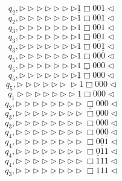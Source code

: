 \documentclass[12pt,a4paper]{article}
\theoremstyle{definition}
\begin{document}
\begin{enumerate}
\begin{enumerate}
			$$q_2,\triangleright\triangleright\triangleright\triangleright\triangleright\triangleright\triangleright\underline{1}\Box001\triangleleft$$
			$$q_2,\triangleright\triangleright\triangleright\triangleright\triangleright\triangleright\triangleright1\underline{\Box}001\triangleleft$$
			$$q_3,\triangleright\triangleright\triangleright\triangleright\triangleright\triangleright\triangleright1\Box\underline{0}01\triangleleft$$
			$$q_3,\triangleright\triangleright\triangleright\triangleright\triangleright\triangleright\triangleright1\Box0\underline{0}1\triangleleft$$
			$$q_3,\triangleright\triangleright\triangleright\triangleright\triangleright\triangleright\triangleright1\Box00\underline{1}\triangleleft$$
			$$q_5,\triangleright\triangleright\triangleright\triangleright\triangleright\triangleright\triangleright1\Box0\underline{0}0\triangleleft$$
			$$q_5,\triangleright\triangleright\triangleright\triangleright\triangleright\triangleright\triangleright1\underline{\Box}000\triangleleft$$
			$$q_5,\triangleright\triangleright\triangleright\triangleright\triangleright\triangleright\triangleright\underline{1}\Box000\triangleleft$$
			$$q_5,\triangleright\triangleright\triangleright\triangleright\triangleright\triangleright\underline{\triangleright}1\Box000\triangleleft$$
			$$q_1\triangleright\triangleright\triangleright\triangleright\triangleright\triangleright\triangleright\underline{1}\Box000\triangleleft$$
			$$q_2,\triangleright\triangleright\triangleright\triangleright\triangleright\triangleright\triangleright\triangleright\underline{\Box}000\triangleleft$$
			$$q_3,\triangleright\triangleright\triangleright\triangleright\triangleright\triangleright\triangleright\triangleright\Box\underline{0}00\triangleleft$$
			$$q_3,\triangleright\triangleright\triangleright\triangleright\triangleright\triangleright\triangleright\triangleright\Box000\underline{\triangleleft}$$
			$$q_4,\triangleright\triangleright\triangleright\triangleright\triangleright\triangleright\triangleright\triangleright\Box00\underline{0}\triangleleft$$
			$$q_4,\triangleright\triangleright\triangleright\triangleright\triangleright\triangleright\triangleright\triangleright\Box0\underline{0}1\triangleleft$$
			$$q_4,\triangleright\triangleright\triangleright\triangleright\triangleright\triangleright\triangleright\triangleright\Box\underline{0}11\triangleleft$$
			$$q_4,\triangleright\triangleright\triangleright\triangleright\triangleright\triangleright\triangleright\triangleright\underline{\Box}111\triangleleft$$
			$$q_3,\triangleright\triangleright\triangleright\triangleright\triangleright\triangleright\triangleright\triangleright\Box\underline{1}11\triangleleft$$

\end{enumerate}
\end{enumerate}
\end{document}
